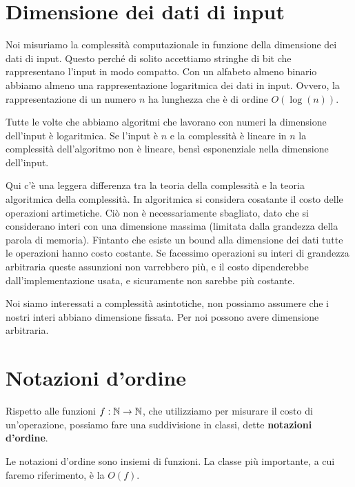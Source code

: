 \section{Dimensione dei dati di input}

Noi misuriamo la complessità computazionale in funzione della dimensione dei dati di input. Questo
perché di solito accettiamo stringhe di bit che rappresentano l'input in modo compatto. Con un
alfabeto almeno binario abbiamo almeno una rappresentazione logaritmica dei dati in input. Ovvero,
la rappresentazione di un numero $n$ ha lunghezza che è di ordine $O(\log(n))$.

Tutte le volte che abbiamo algoritmi che lavorano con numeri la dimensione dell'input è
logaritmica. Se l'input è $n$ e la complessità è lineare in $n$ la complessità dell'algoritmo
non è lineare, bensì esponenziale nella dimensione dell'input.

Qui c'è una leggera differenza tra la teoria della complessità e la teoria algoritmica della
complessità. In algoritmica si considera cosatante il costo delle operazioni artimetiche. Ciò non è
necessariamente sbagliato, dato che si considerano interi con una dimensione massima (limitata dalla
grandezza della parola di memoria). Fintanto che esiste un bound alla dimensione dei dati tutte le
operazioni hanno costo costante. Se facessimo operazioni su interi di grandezza arbitraria queste
assunzioni non varrebbero più, e il costo dipenderebbe dall'implementazione usata, e sicuramente non
sarebbe più costante.

Noi siamo interessati a complessità asintotiche, non possiamo assumere che i nostri interi abbiano
dimensione fissata. Per noi possono avere dimensione arbitraria.

\section{Notazioni d'ordine}

Rispetto alle funzioni $f:\mathbb{N} \to \mathbb{N}$, che utilizziamo per misurare il costo di un'operazione,
possiamo fare una suddivisione in classi, dette \textbf{notazioni d'ordine}.

Le notazioni d'ordine sono insiemi di funzioni. La classe più importante, a cui faremo riferimento,
è la $O(f)$.

